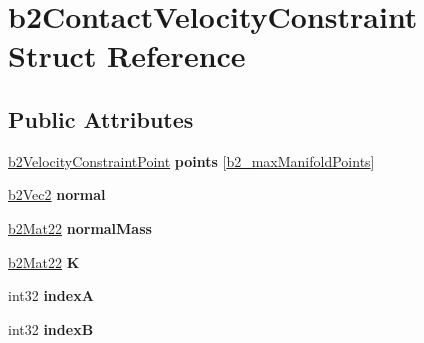 \hypertarget{structb2_contact_velocity_constraint}{}\section{b2\+Contact\+Velocity\+Constraint Struct Reference}
\label{structb2_contact_velocity_constraint}
\subsection*{Public Attributes}
\begin{DoxyCompactItemize}
\item 
\mbox{\label{structb2_contact_velocity_constraint_a549a4b6f915af5516234ece57b60e0dd}} 
\hyperlink{structb2_velocity_constraint_point}{b2\+Velocity\+Constraint\+Point} {\bfseries points} \mbox{[}\hyperlink{b2_settings_8h_aa5f44cc9edf711433dea2b2ec94f3c42}{b2\+\_\+max\+Manifold\+Points}\mbox{]}
\item 
\mbox{\label{structb2_contact_velocity_constraint_a1da730d689f89bd89cab06c5792f9bf3}} 
\hyperlink{structb2_vec2}{b2\+Vec2} {\bfseries normal}
\item 
\mbox{\label{structb2_contact_velocity_constraint_a0ee46cdf9b9136484e6a2ca25ac7cd4b}} 
\hyperlink{structb2_mat22}{b2\+Mat22} {\bfseries normal\+Mass}
\item 
\mbox{\label{structb2_contact_velocity_constraint_a36c427f978d6f390552220b8ad21e1a9}} 
\hyperlink{structb2_mat22}{b2\+Mat22} {\bfseries K}
\item 
\mbox{\label{structb2_contact_velocity_constraint_a44a5ddedc5058c2453e873b999acd547}} 
int32 {\bfseries indexA}
\item 
\mbox{\label{structb2_contact_velocity_constraint_a55a9fd87a6e560fe83d81d6b9c14f356}} 
int32 {\bfseries indexB}
\item 
\mbox{\label{structb2_contact_velocity_constraint_a529003546429532d186130ca35f2178e}} 

\end{DoxyCompactItemize}
